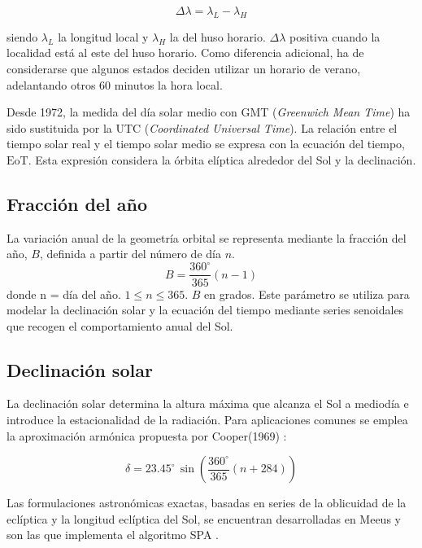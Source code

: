 \begin{equation}
    \Delta \lambda = \lambda_L - \lambda_H    \label{eq:deltalambda}
\end{equation}

siendo $\lambda_L$ la longitud local y $\lambda_H$ la del huso horario. $\Delta \lambda$ positiva cuando la localidad está al este del huso horario. Como diferencia adicional, ha de considerarse que algunos estados deciden utilizar un horario de verano, adelantando otros 60 minutos la hora local.

Desde 1972, la medida del día solar medio con GMT (\textit{Greenwich Mean Time}) ha sido sustituida por la UTC (\textit{Coordinated Universal Time}). La relación entre el tiempo solar real y el tiempo solar medio se expresa con la ecuación del tiempo, $\mathrm{EoT}$. Esta expresión considera la órbita elíptica alrededor del Sol y la declinación.




\subsection{Fracción del año}

La variación anual de la geometría orbital se representa mediante la fracción del año, $B$, definida a partir del número de día $n$. 
\begin{equation}
    B = \frac{360^\circ}{365}(n - 1)
\end{equation}
donde n = día del año. \( 1 \leq n \leq 365 \). $B$ en grados.
Este parámetro se utiliza para modelar la declinación solar y la ecuación del tiempo mediante series senoidales que recogen el comportamiento anual del Sol.

\subsection{Declinación solar}

La declinación solar determina la altura máxima que alcanza el Sol a mediodía e introduce la estacionalidad de la radiación. Para 
aplicaciones comunes se emplea la aproximación armónica propuesta por Cooper(1969) 
\cite{noaa_solar}:

\begin{equation}
    \delta = 23.45^\circ \, \sin\left(\frac{360^\circ}{365}(n + 284)\right)
\end{equation}

Las formulaciones astronómicas exactas, basadas en series de la oblicuidad de la eclíptica y la 
longitud eclíptica del Sol, se encuentran desarrolladas en Meeus \cite{meeus1998} y son las que implementa el algoritmo SPA \cite{reda2008spa}.

